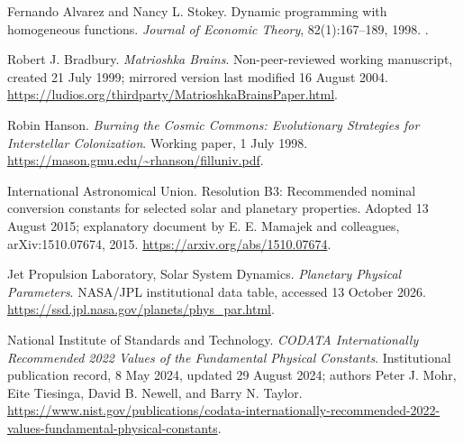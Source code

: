 Fernando Alvarez and Nancy L. Stokey.
\newblock Dynamic programming with homogeneous functions.
\newblock \emph{Journal of Economic Theory}, 82(1):167--189, 1998.
\newblock {}.

Robert J. Bradbury.
\newblock \emph{Matrioshka Brains}.
\newblock Non-peer-reviewed working manuscript, created 21 July 1999;
mirrored version last modified 16 August 2004.
\newblock \url{https://ludios.org/thirdparty/MatrioshkaBrainsPaper.html}.

Robin Hanson.
\newblock \emph{Burning the Cosmic Commons: Evolutionary Strategies for
Interstellar Colonization}.
\newblock Working paper, 1 July 1998.
\newblock \url{https://mason.gmu.edu/~rhanson/filluniv.pdf}.

International Astronomical Union.
\newblock Resolution B3: Recommended nominal conversion constants for
selected solar and planetary properties.
\newblock Adopted 13 August 2015; explanatory document by E. E. Mamajek
and colleagues, arXiv:1510.07674, 2015.
\newblock \url{https://arxiv.org/abs/1510.07674}.

Jet Propulsion Laboratory, Solar System Dynamics.
\newblock \emph{Planetary Physical Parameters}.
\newblock NASA/JPL institutional data table, accessed 13 October 2026.
\newblock \url{https://ssd.jpl.nasa.gov/planets/phys_par.html}.

National Institute of Standards and Technology.
\newblock \emph{CODATA Internationally Recommended 2022 Values of the
Fundamental Physical Constants}.
\newblock Institutional publication record, 8 May 2024, updated 29 August
2024; authors Peter J. Mohr, Eite Tiesinga, David B. Newell, and Barry N. Taylor.
\newblock \url{https://www.nist.gov/publications/codata-internationally-recommended-2022-values-fundamental-physical-constants}.
